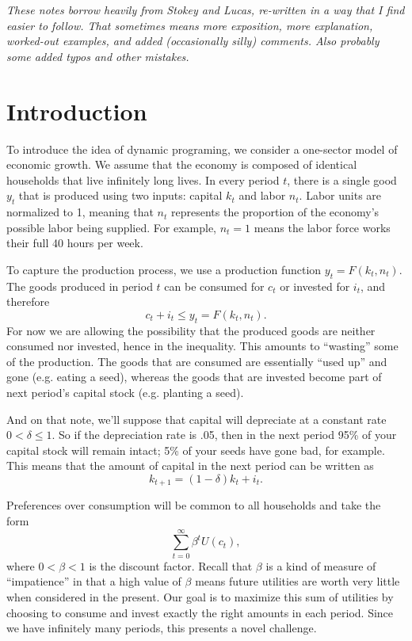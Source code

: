 \documentclass[12pt]{article}
\theoremstyle{definition}
\begin{document}
\maketitle
\singlespace

\noindent \emph{These notes borrow heavily from Stokey and Lucas, re-written in a way that I find easier to follow. That sometimes means more exposition, more explanation, worked-out examples, and added (occasionally silly) comments. Also probably some added typos and other mistakes. }



\section{Introduction}

To introduce the idea of dynamic programing, we consider a one-sector model of economic growth. We assume that the economy is composed of identical households that live infinitely long lives. In every period $t$, there is a single good $y_t$ that is produced using two inputs: capital $k_t$ and labor $n_t$. Labor units are normalized to 1, meaning that $n_t$ represents the proportion of the economy's possible labor being supplied. For example, $n_t=1$ means the labor force works their full 40 hours per week.

To capture the production process, we use a production function $y_t=F(k_t, n_t)$. The goods produced in period $t$ can be consumed for $c_t$ or invested for $i_t$, and therefore
	\[c_t + i_t \leq y_t = F(k_t, n_t).	\]
For now we are allowing the possibility that the produced goods are neither consumed nor invested, hence in the inequality. This amounts to ``wasting''  some of the production. The goods that are consumed are essentially ``used up'' and gone (e.g. eating a seed), whereas the goods that are invested become part of next period's capital stock (e.g. planting a seed). 

And on that note, we'll suppose that capital will depreciate at a constant rate $0 < \delta \leq 1$. So if the depreciation rate is .05, then in the next period 95\% of your capital stock will remain intact; 5\% of your seeds have gone bad, for example. This means that the amount of capital in the next period can be written as
	\[ k_{t+1} = (1 - \delta)k_t + i_t.\]

Preferences over consumption will be common to all households and take the form
	\[	\sum_{t=0}^{\infty} \beta^t U(c_t),\]
where $0 < \beta < 1$ is the discount factor. Recall that $\beta$ is a kind of measure of ``impatience'' in that a high value of $\beta$ means future utilities are worth very little when considered in the present. Our goal is to maximize this sum of utilities by choosing to consume and invest exactly the right amounts in each period. Since we have infinitely many periods, this presents a novel challenge. 
\end{document}
